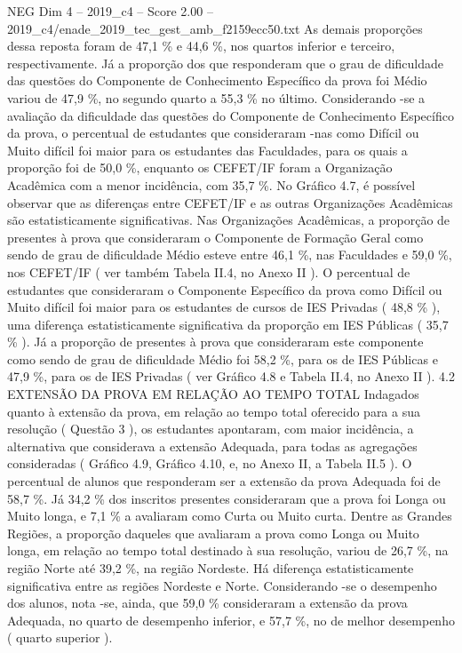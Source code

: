 \begin{textsample}{NEG Dim 4 – 2019\_c4 – Score 2.00 – 2019\_c4/enade\_2019\_tec\_gest\_amb\_f2159ecc50.txt}
As demais proporções dessa reposta foram de 47,1 \% e 44,6 \%, nos quartos inferior e terceiro, respectivamente.
Já a proporção dos que responderam que o grau de dificuldade das questões do Componente de Conhecimento Específico da prova foi Médio variou de 47,9 \%, no segundo quarto a 55,3 \% no último.
Considerando -se a avaliação da dificuldade das questões do Componente de Conhecimento Específico da prova, o percentual de estudantes que consideraram -nas como Difícil ou Muito difícil foi maior para os estudantes das Faculdades, para os quais a proporção foi de 50,0 \%, enquanto os CEFET/IF foram a Organização Acadêmica com a menor incidência, com 35,7 \%.
No Gráfico 4.7, é possível observar que as diferenças entre CEFET/IF e as outras Organizações Acadêmicas são estatisticamente significativas.
Nas Organizações Acadêmicas, a proporção de presentes à prova que consideraram o Componente de Formação Geral como sendo de grau de dificuldade Médio esteve entre 46,1 \%, nas Faculdades e 59,0 \%, nos CEFET/IF ( ver também Tabela II.4, no Anexo II ).
O percentual de estudantes que consideraram o Componente Específico da prova como Difícil ou Muito difícil foi maior para os estudantes de cursos de IES Privadas ( 48,8 \% ), uma diferença estatisticamente significativa da proporção em IES Públicas ( 35,7 \% ).
Já a proporção de presentes à prova que consideraram este componente como sendo de grau de dificuldade Médio foi 58,2 \%, para os de IES Públicas e 47,9 \%, para os de IES Privadas ( ver Gráfico 4.8 e Tabela II.4, no Anexo II ). 4.2 EXTENSÃO DA PROVA EM RELAÇÃO AO TEMPO TOTAL Indagados quanto à extensão da prova, em relação ao tempo total oferecido para a sua resolução ( Questão 3 ), os estudantes apontaram, com maior incidência, a alternativa que considerava a extensão Adequada, para todas as agregações consideradas ( Gráfico 4.9, Gráfico 4.10, e, no Anexo II, a Tabela II.5 ).
O percentual de alunos que responderam ser a extensão da prova Adequada foi de 58,7 \%.
Já 34,2 \% dos inscritos presentes consideraram que a prova foi Longa ou Muito longa, e 7,1 \% a avaliaram como Curta ou Muito curta.
Dentre as Grandes Regiões, a proporção daqueles que avaliaram a prova como Longa ou Muito longa, em relação ao tempo total destinado à sua resolução, variou de 26,7 \%, na região Norte até 39,2 \%, na região Nordeste.
Há diferença estatisticamente significativa entre as regiões Nordeste e Norte.
Considerando -se o desempenho dos alunos, nota -se, ainda, que 59,0 \% consideraram a extensão da prova Adequada, no quarto de desempenho inferior, e 57,7 \%, no de melhor desempenho ( quarto superior ).

\end{textsample}
